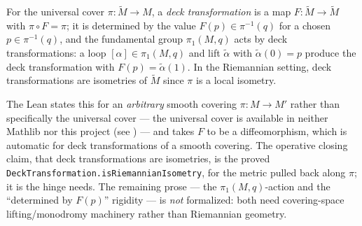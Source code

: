 \begin{definition}
  \label{def:pet-ch6-deck-transformation}
  \leanok
  For the universal cover $\pi:\tilde M\to M$, a \emph{deck transformation} is
  a map $F:\tilde M\to\tilde M$ with $\pi\circ F=\pi$; it is determined by the
  value $F(p)\in\pi^{-1}(q)$ for a chosen $p\in\pi^{-1}(q)$, and the
  fundamental group $\pi_1(M,q)$ acts by deck transformations: a loop
  $[\alpha]\in\pi_1(M,q)$ and lift $\tilde\alpha$ with
  $\tilde\alpha(0)=p$ produce the deck transformation with
  $F(p)=\tilde\alpha(1)$. In the Riemannian setting, deck transformations are
  isometries of $\tilde M$ since $\pi$ is a local isometry.

  The Lean states this for an \emph{arbitrary} smooth covering $\pi:M\to M'$
  rather than specifically the universal cover --- the universal cover is
  available in neither Mathlib nor this project (see
  ) --- and takes $F$ to be a diffeomorphism,
  which is automatic for deck transformations of a smooth covering. The
  operative closing claim, that deck transformations are isometries, is the
  proved \texttt{DeckTransformation.isRiemannianIsometry}, for the metric
  pulled back along $\pi$; it is the hinge 
  needs. The remaining prose --- the $\pi_1(M,q)$-action and the ``determined by
  $F(p)$'' rigidity --- is \emph{not} formalized: both need covering-space
  lifting/monodromy machinery rather than Riemannian geometry.
\end{definition}


